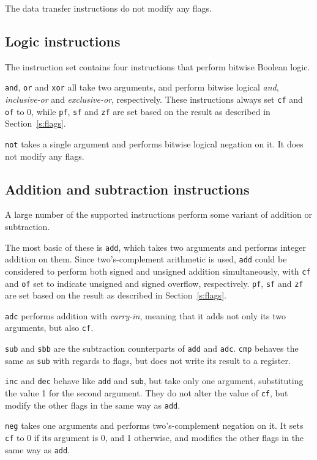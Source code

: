 \documentclass[a4paper,11pt]{kth-mag}
\begin{document}
The data transfer instructions do not modify any flags.

\subsection{Logic instructions}

The instruction set contains four instructions that perform bitwise Boolean logic.

\verb|and|, \verb|or| and \verb|xor| all take two arguments, and perform bitwise logical \emph{and}, \emph{inclusive-or} and \emph{exclusive-or}, respectively.
These instructions always set \verb|cf| and \verb|of| to 0, while \verb|pf|, \verb|sf| and \verb|zf| are set based on the result as described in Section~\ref{s:flags}.

\verb|not| takes a single argument and performs bitwise logical negation on it.
It does not modify any flags.

\subsection{Addition and subtraction instructions}

A large number of the supported instructions perform some variant of addition or subtraction.

The most basic of these is \verb|add|, which takes two arguments and performs integer addition on them.
Since two's-complement arithmetic is used, \verb|add| could be considered to perform both signed and unsigned addition simultaneously, with \verb|cf| and \verb|of| set to indicate unsigned and signed overflow, respectively.
\verb|pf|, \verb|sf| and \verb|zf| are set based on the result as described in Section~\ref{s:flags}.

\verb|adc| performs addition with \emph{carry-in}, meaning that it adds not only its two arguments, but also \verb|cf|.

\verb|sub| and \verb|sbb| are the subtraction counterparts of \verb|add| and \verb|adc|.
\verb|cmp| behaves the same as \verb|sub| with regards to flags, but does not write its result to a register.

\verb|inc| and \verb|dec| behave like \verb|add| and \verb|sub|, but take only one argument, substituting the value 1 for the second argument.
They do not alter the value of \verb|cf|, but modify the other flags in the same way as \verb|add|.

\verb|neg| takes one arguments and performs two's-complement negation on it.
It sets \verb|cf| to 0 if its argument is 0, and 1 otherwise, and modifies the other flags in the same way as \verb|add|.
\end{document}
